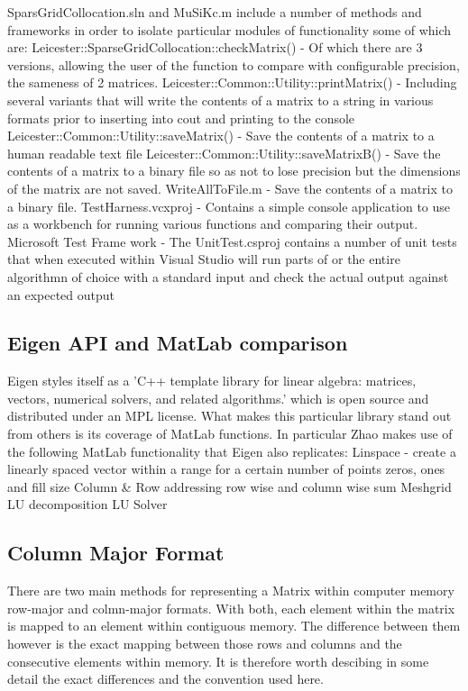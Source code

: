 \documentclass[a4paper]{amsart}
\begin{document}
SparsGridCollocation.sln and MuSiKc.m include a number of methods and frameworks in order to isolate particular modules of functionality some of which are:
Leicester::SparseGridCollocation::checkMatrix() - Of which there are 3 versions, allowing the user of the function to compare with configurable precision, the sameness of 2 matrices.
Leicester::Common::Utility::printMatrix() - Including several variants that will write the contents of a matrix to a string in various formats prior to inserting into cout and printing to the console
Leicester::Common::Utility::saveMatrix() - Save the contents of a matrix to a human readable text file
Leicester::Common::Utility::saveMatrixB() - Save the contents of a matrix to a binary file so as not to lose precision but the dimensions of the matrix are not saved.
WriteAllToFile.m - Save the contents of a matrix to a binary file.
TestHarness.vcxproj - Contains a simple console application to use as a workbench for running various functions and comparing their output.
Microsoft Test Frame work -  The UnitTest.csproj contains a number of unit tests that when executed within Visual Studio will run parts of or the entire algorithmn of choice with a standard input and check the actual output against an expected output


\subsection{Eigen API and MatLab comparison}
Eigen styles itself as a 'C++ template library for linear algebra: matrices, vectors, numerical solvers, and related algorithms.' which is open source and distributed under an MPL license. What makes this particular library stand out from others is its coverage of MatLab functions. In particular Zhao makes use of the following MatLab functionality that Eigen also replicates:
Linspace - create a linearly spaced vector within a range for a certain number of points
zeros, ones and fill
size
Column \& Row addressing
row wise and column wise sum
Meshgrid
LU decomposition
LU Solver

\subsection{Column Major Format}
There are two main methods for representing a Matrix within computer memory row-major and colmn-major formats. With both, each element within the matrix is mapped to an element within contiguous memory. The difference between them however is the exact mapping between those rows and columns and the consecutive elements within memory. It is therefore worth descibing in some detail the exact differences and the convention used here.
\end{document}
